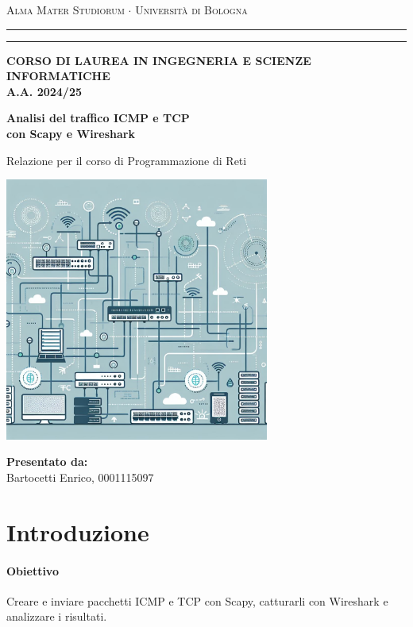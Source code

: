 \documentclass[12pt,a4paper]{report}
\begin{document}
\begin{titlepage}
\begin{center}
{{\Large{\textsc{Alma Mater Studiorum $\cdot$ Università di Bologna}}}} \rule[0.1cm]{15.8cm}{0.1mm}
\rule[0.5cm]{15.8cm}{0.6mm}
{\small{\bf CORSO DI LAUREA IN INGEGNERIA E SCIENZE INFORMATICHE \\ A.A. 2024/25 }}
\end{center}
\vspace{15mm}
\begin{center}
{\LARGE{\bf Analisi del traffico ICMP e TCP}}\\
\vspace{2mm}
{\LARGE{\bf con Scapy e Wireshark}}
\end{center}
\begin{center}
{\LARGE Relazione per il corso di Programmazione di Reti}
\end{center}

\vspace{8mm}
\begin{center}
\includegraphics[width=0.65\textwidth]{Copertina}
\end{center}
\vspace{15mm}

{\large{\bf \noindent
Presentato da:\\}
Bartocetti Enrico, 0001115097}
\end{titlepage}

\tableofcontents

\chapter{Introduzione}

\subsubsection{Obiettivo}
Creare e inviare pacchetti ICMP e TCP con Scapy, catturarli con Wireshark e analizzare i risultati.
\end{document}

